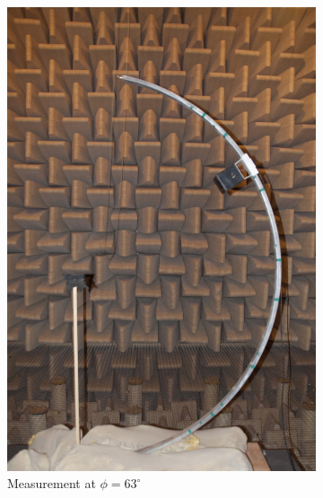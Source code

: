 
\begin{figure}[h!]
        \centering

        \begin{subfigure}[b]{0.33\textwidth}
                \centering
    			\includegraphics[height=0.28\textheight]{cover/onzecover.jpg}
    			\caption{Measurement at $\phi=63^\circ$}
			    \label{fig:phi=63}
        \end{subfigure}~
        \begin{subfigure}[b]{0.33\textwidth}
			    \centering

\end{subfigure}
\end{figure}
